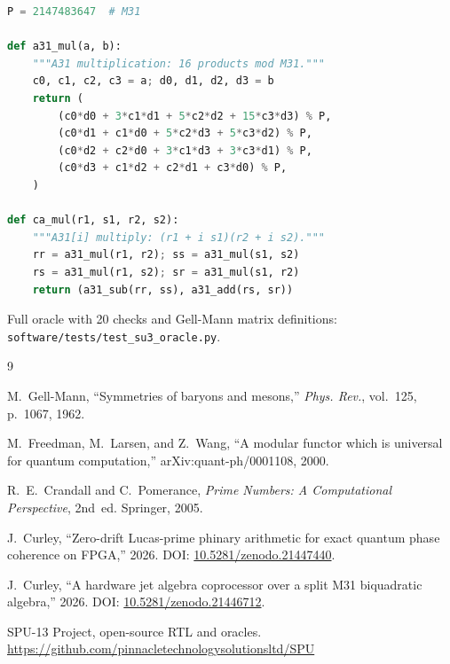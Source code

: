 \documentclass[conference]{IEEEtran}
\begin{document}
\begin{lstlisting}[language=Python]
P = 2147483647  # M31

def a31_mul(a, b):
    """A31 multiplication: 16 products mod M31."""
    c0, c1, c2, c3 = a; d0, d1, d2, d3 = b
    return (
        (c0*d0 + 3*c1*d1 + 5*c2*d2 + 15*c3*d3) % P,
        (c0*d1 + c1*d0 + 5*c2*d3 + 5*c3*d2) % P,
        (c0*d2 + c2*d0 + 3*c1*d3 + 3*c3*d1) % P,
        (c0*d3 + c1*d2 + c2*d1 + c3*d0) % P,
    )

def ca_mul(r1, s1, r2, s2):
    """A31[i] multiply: (r1 + i s1)(r2 + i s2)."""
    rr = a31_mul(r1, r2); ss = a31_mul(s1, s2)
    rs = a31_mul(r1, s2); sr = a31_mul(s1, r2)
    return (a31_sub(rr, ss), a31_add(rs, sr))
\end{lstlisting}

Full oracle with 20 checks and Gell-Mann matrix definitions:
\texttt{software/tests/test\_su3\_oracle.py}.

\begin{thebibliography}{9}

M.~Gell-Mann, ``Symmetries of baryons and mesons,''
\emph{Phys. Rev.}, vol.~125, p.~1067, 1962.

M.~Freedman, M.~Larsen, and Z.~Wang, ``A modular functor which is universal
for quantum computation,'' arXiv:quant-ph/0001108, 2000.

R.~E.~Crandall and C.~Pomerance, \emph{Prime Numbers: A Computational
Perspective}, 2nd~ed. Springer, 2005.

J.~Curley, ``Zero-drift Lucas-prime phinary arithmetic for exact quantum
phase coherence on FPGA,'' 2026. DOI:
\href{https://doi.org/10.5281/zenodo.21447440}{10.5281/zenodo.21447440}.

J.~Curley, ``A hardware jet algebra coprocessor over a split M31
biquadratic algebra,'' 2026. DOI:
\href{https://doi.org/10.5281/zenodo.21446712}{10.5281/zenodo.21446712}.

SPU-13 Project, open-source RTL and oracles.
\url{https://github.com/pinnacletechnologysolutionsltd/SPU}

\end{thebibliography}
\end{document}
